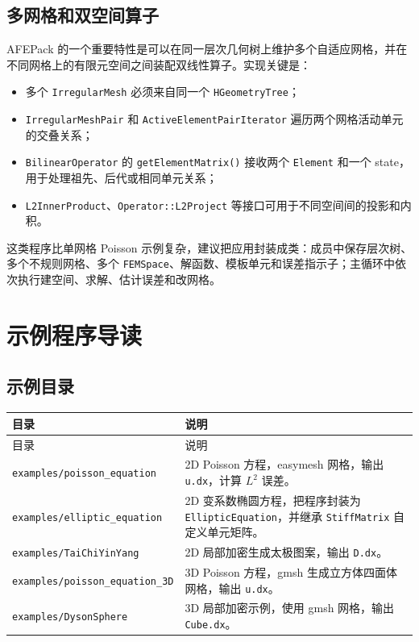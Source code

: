 \documentclass[UTF8,openany,zihao=-4,scheme=chinese]{ctexbook}
\newcommand{\file}[1]{\nolinkurl{#1}}
\newcommand{\class}[1]{\texttt{#1}}
\begin{document}
\section{多网格和双空间算子}

AFEPack 的一个重要特性是可以在同一层次几何树上维护多个自适应网格，并在不同网格上的有限元空间之间装配双线性算子。实现关键是：

\begin{itemize}[leftmargin=2em]
  \item 多个 \class{IrregularMesh} 必须来自同一个 \class{HGeometryTree}；
  \item \class{IrregularMeshPair} 和 \class{ActiveElementPairIterator} 遍历两个网格活动单元的交叠关系；
  \item \class{BilinearOperator} 的 \class{getElementMatrix()} 接收两个 \class{Element} 和一个 state，用于处理祖先、后代或相同单元关系；
  \item \class{L2InnerProduct}、\class{Operator::L2Project} 等接口可用于不同空间间的投影和内积。
\end{itemize}

这类程序比单网格 Poisson 示例复杂，建议把应用封装成类：成员中保存层次树、多个不规则网格、多个 \class{FEMSpace}、解函数、模板单元和误差指示子；主循环中依次执行建空间、求解、估计误差和改网格。

\chapter{示例程序导读}

\section{示例目录}

\begin{longtable}{p{}p{}}
\toprule
目录 & 说明\\
\midrule
\endfirsthead
\toprule
目录 & 说明\\
\midrule
\endhead
\file{examples/poisson_equation} & 2D Poisson 方程，easymesh 网格，输出 \file{u.dx}，计算 $L^2$ 误差。\\
\file{examples/elliptic_equation} & 2D 变系数椭圆方程，把程序封装为 \class{EllipticEquation}，并继承 \class{StiffMatrix} 自定义单元矩阵。\\
\file{examples/TaiChiYinYang} & 2D 局部加密生成太极图案，输出 \file{D.dx}。\\
\file{examples/poisson_equation_3D} & 3D Poisson 方程，gmsh 生成立方体四面体网格，输出 \file{u.dx}。\\
\file{examples/DysonSphere} & 3D 局部加密示例，使用 gmsh 网格，输出 \file{Cube.dx}。\\
\bottomrule
\end{longtable}
\end{document}
